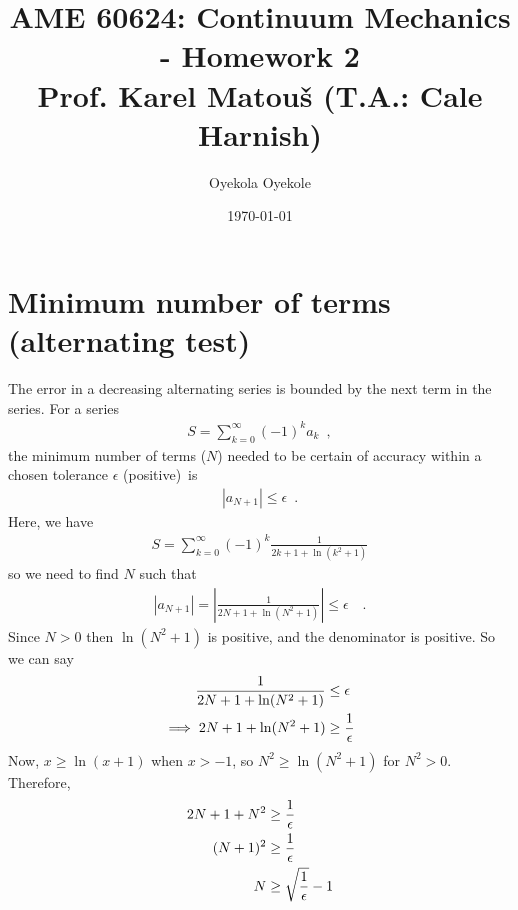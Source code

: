 \documentclass[a4paper]{article}
\title{\large AME 60624: Continuum Mechanics - Homework 2 \\ Prof. Karel Matou\v{s} (T.A.: Cale Harnish)}
\author{Oyekola Oyekole}
\date{\today}
\begin{document}


\section{Minimum number of terms (alternating test)}
\label{problem1}
The error in a decreasing alternating series is bounded by the next term in the series. 
For a series \begin{align*}
S = \sum_{k=0}^\infty (-1)^ka_k \enspace,
\end{align*}
the minimum number of terms ($N$) needed to be certain of accuracy within a chosen tolerance $\epsilon$ (positive)\ is 
\begin{align}
|a_{N+1}|\le \epsilon \enspace.
\end{align}
Here, we have 
\begin{align*}
S = \sum_{k=0}^\infty(-1)^k\frac{1}{2k+1+\ln(k^2+1)}
\end{align*}
so we need to find $N$ such that 
\begin{align}
|a_{N+1}|=\left|\frac{1}{2N+1+\ln(N^2+1)}\right| \le \epsilon \quad .
\end{align}
Since $N > 0$ then $\ln(N^2+1)$ is positive, and the denominator is positive. So we can say
\begin{align}
\frac{1}{2N+1+\ln(N^2+1)} &\le \epsilon \notag \\
\implies 2N+1+\ln(N^2+1) &\ge \frac{1}{\epsilon}
\end{align}
Now, $x \ge \ln(x+1)$ when $x > -1$, so $N^2 \ge \ln(N^2 + 1)$ for $N^2 > 0$. Therefore,
\begin{align}
2N+1+N^2 &\ge \frac1{\epsilon} \notag\\
(N+1)^2 &\ge \frac{1}{\epsilon} \notag\\
N &\ge\sqrt{\frac1{\epsilon}}-1
\end{align}
\end{document}
